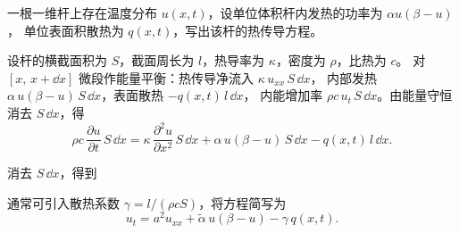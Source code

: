 ﻿

\begin{question}[一维杆热传导方程]

一根一维杆上存在温度分布 $u(x,t)$，设单位体积杆内发热的功率为 $\alpha u(\beta-u)$，
单位表面积散热为 $q(x,t)$，写出该杆的热传导方程。

\begin{solution}


设杆的横截面积为 $S$，截面周长为 $l$，热导率为 $\kappa$，密度为 $\rho$，比热为 $c$。
对 $[x,\,x+\dd x]$ 微段作能量平衡：热传导净流入 $\kappa\,u_{xx}\,S\,\dd x$，
内部发热 $\alpha\,u(\beta-u)\,S\,\dd x$，表面散热 $-q(x,t)\,l\,\dd x$，
内能增加率 $\rho c\,u_t\,S\,\dd x$。由能量守恒消去 $S\,\dd x$，得
\[
\rho c\,\frac{\partial u}{\partial t}\,S\,\dd x
= \kappa\,\frac{\partial^{2} u}{\partial x^{2}}\,S\,\dd x
+ \alpha\,u(\beta-u)\,S\,\dd x
- q(x,t)\,l\,\dd x.
\]

消去 $S\,\dd x$，得到


通常可引入散热系数 $\gamma = l/(\rho c S)$，将方程简写为
\[
u_{t} = a^{2} u_{xx} + \tilde\alpha\,u(\beta-u) - \gamma\,q(x,t).
\]

\end{solution}
\end{question}

